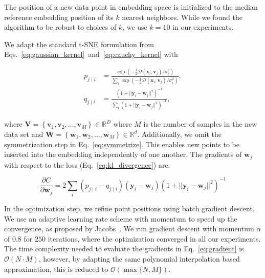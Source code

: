 \documentclass[runningheads]{llncs}
\begin{document}
The position of a new data
point in embedding space is initialized 
to the median reference embedding position of its $k$ nearest 
neighbors. While we found the algorithm to be
robust to choices of $k$, we use $k=10$ in our experiments.

We adapt the standard t-SNE formulation from
Eqs.~\ref{eq:gaussian_kernel}~and~\ref{eq:cauchy_kernel} with

\begin{align}
p_{j \mid i} &= \frac{\exp \left ( -\frac{1}{2} \mathcal{D}(\mathbf{x}_i, \mathbf{v}_j) / \sigma_i^2 \right )}{\sum_{i} \exp \left ( -\frac{1}{2} \mathcal{D}(\mathbf{x}_i, \mathbf{v}_j) / \sigma_i^2 \right )}, \\
q_{j \mid i} &= \frac{\left ( 1 + || \mathbf{y}_i - \mathbf{w}_j ||^2 \right )^{-1}}{\sum_{i}\left ( 1 + || \mathbf{y}_i - \mathbf{w}_j ||^2 \right )^{-1}},
\end{align}

\noindent where $\mathbf{V} = \left \{ \mathbf{v}_1, \mathbf{v}_2, \dots,
\mathbf{v}_M \right \} \in \mathbb{R}^D$ where $M$ is the number of samples in
the new data set and $\mathbf{W} = \left \{ \mathbf{w}_1, \mathbf{w}_2, \dots,
\mathbf{w}_M \right \} \in \mathbb{R}^d$. Additionally, we omit the
symmetrization step in Eq.~\ref{eq:symmetrize}. This enables new points to be
inserted into the embedding independently of one another. The gradients of
$\mathbf{w}_j$ with respect to the loss (Eq.~\ref{eq:kl_divergence}) are:

\begin{equation}
\frac{\partial C}{\partial \mathbf{w}_j} = 2 \sum_i \left ( p_{j \mid i} - q_{j \mid i} \right ) \left ( \mathbf{y}_i - \mathbf{w}_j \right ) \left ( 1 + || \mathbf{y}_i - \mathbf{w}_j || ^2 \right )^{-1}
\label{eq:gradient}
\end{equation}

In the optimization step, we refine point positions using batch gradient
descent. We use an adaptive learning rate scheme with momentum 
to speed up the convergence, as proposed by Jacobs~\cite{momentum,bh_tsne}. We run gradient descent
with momentum $\alpha$ of $0.8$ for $250$ iterations, where the
optimization converged in all our experiments. The time complexity
needed to evaluate the gradients in Eq.~\ref{eq:gradient} is $\mathcal{O}(N
\cdot M)$, however, by adapting the same polynomial interpolation based
approximation, this is reduced to $\mathcal{O}(\max \{ N, M \})$.
\end{document}
